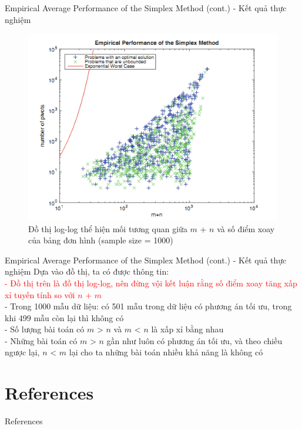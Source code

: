 \documentclass[10pt]{beamer}
\begin{document}
\begin{frame}[fragile]{Empirical Average Performance of the Simplex Method (cont.) - Kết quả thực nghiệm}
\begin{figure}
\includegraphics[scale=.5]{img/plot_1.png}
\caption{Đồ thị log-log thể hiện mối tương quan giữa $m$ + $n$ và số điểm xoay của bảng đơn hình (sample size = 1000)}
\end{figure}
\end{frame}

\begin{frame}[fragile]{Empirical Average Performance of the Simplex Method (cont.) - Kết quả thực nghiệm}
Dựa vào đồ thị, ta có được thông tin: \\
\textcolor{red}{- Đồ thị trên là đồ thị log-log, nên đừng vội kết luận rằng số điểm xoay tăng xấp xỉ tuyến tính so với $n$ + $m$} \\
- Trong 1000 mẫu dữ liệu: có 501 mẫu trong dữ liệu có phương án tối ưu, trong khi 499 mẫu còn lại thì không có \\
- Số lượng bài toán có $m$ > $n$ và $m$ < $n$ là xấp xỉ bằng nhau \\
- Những bài toán có $m$ > $n$ gần như luôn có phương án tối ưu, và theo chiều ngược lại, $n$ < $m$ lại cho ta những bài toán nhiều khả năng là không có\\
\end{frame}

\section{References}
\begin{frame}[allowframebreaks]{References}
\printbibliography
\end{frame}
\end{document}
